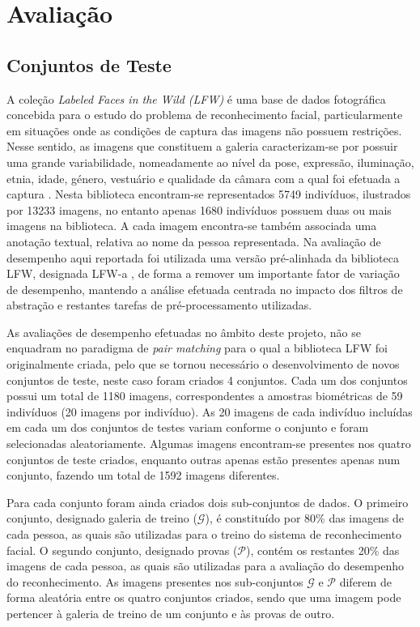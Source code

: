 \documentclass{llncs}
\begin{document}
\section{Avaliação}
\subsection{Conjuntos de Teste} \label{sec:conjuntos}
A coleção \textit{Labeled Faces in the Wild (LFW)} \cite{Huang2007} é uma base de dados fotográfica concebida para o estudo do problema de reconhecimento facial, particularmente em situações onde as condições de captura das imagens não possuem restrições. Nesse sentido, as imagens que constituem a galeria caracterizam-se por possuir uma grande variabilidade, nomeadamente ao nível da pose, expressão, iluminação, etnia, idade, género, vestuário e qualidade da câmara com a qual foi efetuada a captura \cite{Huang2007}. Nesta biblioteca encontram-se representados 5749 indivíduos, ilustrados por 13233 imagens, no entanto apenas 1680 indivíduos possuem duas ou mais imagens na biblioteca. A cada imagem encontra-se também associada uma anotação textual, relativa ao nome da pessoa representada. Na avaliação de desempenho aqui reportada foi utilizada uma versão pré-alinhada da biblioteca LFW, designada LFW-a \cite{WHT:BMVC09:MOS}, de forma a remover um importante fator de variação de desempenho, mantendo a análise efetuada centrada no impacto dos filtros de abstração e restantes tarefas de pré-processamento utilizadas.

As avaliações de desempenho efetuadas no âmbito deste projeto, não se enquadram no paradigma de \textit{pair matching} para o qual a biblioteca LFW foi originalmente criada, pelo que se tornou necessário o desenvolvimento de novos conjuntos de teste, neste caso foram criados 4 conjuntos. Cada um dos conjuntos possui um total de 1180 imagens, correspondentes a amostras biométricas de 59 indivíduos (20 imagens por indivíduo). As 20 imagens de cada indivíduo incluídas em cada um dos conjuntos de testes variam conforme o conjunto e foram selecionadas aleatoriamente. Algumas imagens encontram-se presentes nos quatro conjuntos de teste criados, enquanto outras apenas estão presentes apenas num conjunto, fazendo um total de 1592 imagens diferentes.

Para cada conjunto foram ainda criados dois sub-conjuntos de dados. O primeiro conjunto, designado galeria de treino ($\mathscr{G}$), é constituído por 80\% das imagens de cada pessoa, as quais são utilizadas para o treino  do sistema de reconhecimento facial. O segundo conjunto, designado provas ($\mathscr{P}$), contém os restantes 20\% das imagens de cada pessoa, as quais são utilizadas para a avaliação do desempenho do reconhecimento. As imagens presentes nos sub-conjuntos $\mathscr{G}$ e $\mathscr{P}$ diferem de forma aleatória entre os quatro conjuntos criados, sendo que uma imagem pode pertencer à galeria de treino de um conjunto e às provas de outro.
\end{document}
